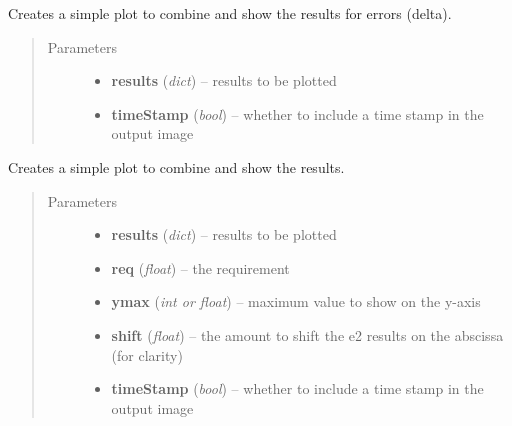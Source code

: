 \documentclass[a4paper,12pt,english]{sphinxmanual}
\begin{document}
\begin{fulllineitems}
\label{reduction:analysis.biasCalibration.plotNumberOfFramesDelta}
Creates a simple plot to combine and show the results for errors (delta).
\begin{quote}\begin{description}
\item[{Parameters}] \leavevmode\begin{itemize}
\item {} 
\textbf{results} (\emph{dict}) -- results to be plotted

\item {} 
\textbf{timeStamp} (\emph{bool}) -- whether to include a time stamp in the output image

\end{itemize}

\end{description}\end{quote}

\end{fulllineitems}


\begin{fulllineitems}
\label{reduction:analysis.biasCalibration.plotNumberOfFramesSigma}
Creates a simple plot to combine and show the results.
\begin{quote}\begin{description}
\item[{Parameters}] \leavevmode\begin{itemize}
\item {} 
\textbf{results} (\emph{dict}) -- results to be plotted

\item {} 
\textbf{req} (\emph{float}) -- the requirement

\item {} 
\textbf{ymax} (\emph{int or float}) -- maximum value to show on the y-axis

\item {} 
\textbf{shift} (\emph{float}) -- the amount to shift the e2 results on the abscissa (for clarity)

\item {} 
\textbf{timeStamp} (\emph{bool}) -- whether to include a time stamp in the output image

\end{itemize}

\end{description}\end{quote}

\end{fulllineitems}
\end{document}
